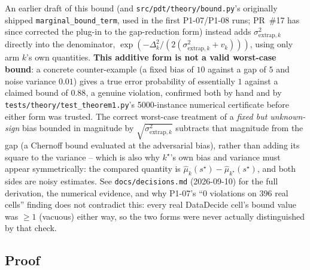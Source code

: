 \begin{remark}
\label{rem:not-additive}
An earlier draft of this bound (and \texttt{src/pdt/theory/bound.py}'s originally shipped
\texttt{marginal\_bound\_term}, used in the first P1-07/P1-08 runs; PR~\#17 has since corrected
the plug-in to the gap-reduction form) instead adds
$\sigma^2_{\mathrm{extrap}, k}$ directly into the denominator,
$\exp(-\Delta_k^2 / (2(\sigma^2_{\mathrm{extrap}, k} + v_k)))$, using only arm $k$'s own
quantities. \textbf{This additive form is not a valid worst-case bound}: a concrete
counter-example (a fixed bias of $10$ against a gap of $5$ and noise variance $0.01$) %
gives a true error probability of essentially $1$ against a claimed bound of $0.88$, %
a genuine violation, confirmed both by hand and by
\texttt{tests/theory/test\_theorem1.py}'s 5000-instance numerical certificate before
either form was trusted. The correct worst-case treatment of a \emph{fixed but
unknown-sign} bias bounded in magnitude by $\sqrt{\sigma^2_{\mathrm{extrap}, k}}$
subtracts that magnitude from the gap (a Chernoff bound evaluated at the adversarial
bias), rather than adding its square to the variance -- which is also why $k^\star$'s
own bias and variance must appear symmetrically: the compared quantity is
$\hat\mu_k(s^\star) - \hat\mu_{k^\star}(s^\star)$, and both sides are noisy estimates.
See \texttt{docs/decisions.md} (2026-09-10) for the full derivation, the numerical
evidence, and why P1-07's ``0 violations on 396 real cells'' finding does not
contradict this: every real DataDecide cell's bound value was $\ge 1$ (vacuous) either
way, so the two forms were never actually distinguished by that check.
\end{remark}

\subsection{Proof}

